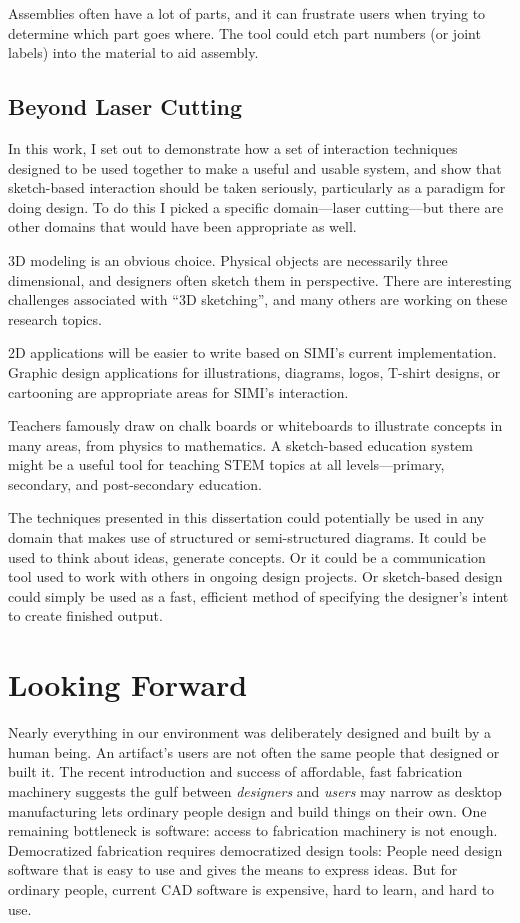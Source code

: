 Assemblies often have a lot of parts, and it can frustrate users when
trying to determine which part goes where. The tool could etch part
numbers (or joint labels) into the material to aid assembly.

\subsection{Beyond Laser Cutting}

In this work, I set out to demonstrate how a set of interaction
techniques designed to be used together to make a useful and usable
system, and show that sketch-based interaction should be taken
seriously, particularly as a paradigm for doing design. To do this I
picked a specific domain---laser cutting---but there are other domains
that would have been appropriate as well. 

3D modeling is an obvious choice. Physical objects are necessarily
three dimensional, and designers often sketch them in
perspective. There are interesting challenges associated with ``3D
sketching'', and many others are working on these research topics.

2D applications will be easier to write based on SIMI's current
implementation. Graphic design applications for illustrations,
diagrams, logos, T-shirt designs, or cartooning are appropriate areas
for SIMI's interaction.

Teachers famously draw on chalk boards or whiteboards to illustrate
concepts in many areas, from physics to mathematics. A sketch-based
education system might be a useful tool for teaching STEM topics at
all levels---primary, secondary, and post-secondary education.

The techniques presented in this dissertation could potentially be used
in any domain that makes use of structured or semi-structured
diagrams. It could be used to think about ideas, generate concepts. Or
it could be a communication tool used to work with others in ongoing
design projects. Or sketch-based design could simply be used as a
fast, efficient method of specifying the designer's intent to create
finished output.

\section{Looking Forward}

Nearly everything in our environment was deliberately designed and
built by a human being. An artifact's users are not often the same
people that designed or built it. The recent introduction and success
of affordable, fast fabrication machinery suggests the gulf between
\textit{designers} and \textit{users} may narrow as desktop
manufacturing lets ordinary people design and build things on their
own. One remaining bottleneck is software: access to fabrication
machinery is not enough. Democratized fabrication requires
democratized design tools: People need design software that is easy to
use and gives the means to express ideas. But for ordinary people,
current CAD software is expensive, hard to learn, and hard to use.

